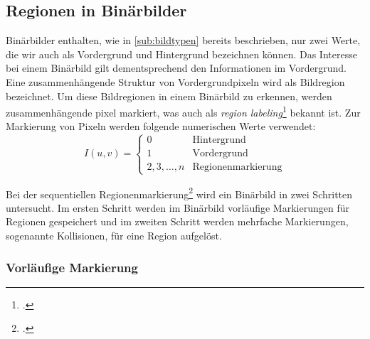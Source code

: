 \subsection{Regionen in Binärbilder} %
\label{sec:regionen_in_binärbilder}

Binärbilder enthalten, wie in \autoref{sub:bildtypen} bereits beschrieben, nur zwei Werte, die wir auch als Vordergrund
 und Hintergrund bezeichnen können. Das Interesse bei einem Binärbild gilt dementsprechend den Informationen im
 Vordergrund. Eine zusammenhängende Struktur von Vordergrundpixeln wird als Bildregion bezeichnet. Um diese
 Bildregionen in einem Binärbild zu erkennen, werden zusammenhängende \gls{pixel} markiert, was auch als
 \textit{region labeling}\footcite[Vgl.][S.~196]{burger05} bekannt ist. Zur Markierung von Pixeln werden folgende
 numerischen Werte verwendet:
\begin{equation*}
	I(u,v) = \begin{cases}
	0 & \textrm{Hintergrund}\\
	1 & \textrm{Vordergrund}\\
	2,3,\ldots,n & \textrm{Regionenmarkierung}
	\end{cases}
\end{equation*}

Bei der sequentiellen Regionenmarkierung\footcite[Vgl.][S.~200--206]{burger05} wird ein Binärbild in zwei Schritten
 untersucht. Im ersten Schritt werden im Binärbild vorläufige Markierungen für Regionen gespeichert und im zweiten
 Schritt werden mehrfache Markierungen, sogenannte Kollisionen, für eine Region aufgelöst.

\subsubsection{Vorläufige Markierung} %
\label{sec:vorläufige_makierung}


